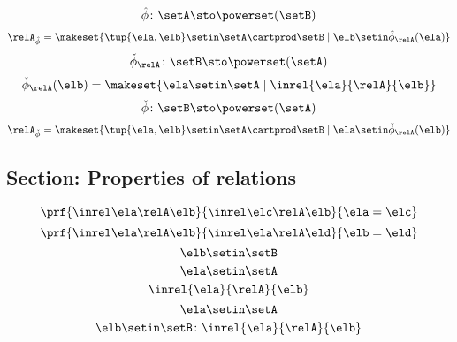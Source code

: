 \begin{forslides}
\begin{equation}
\hat \phi \colon \setA \sto \powerset (\setB)
\end{equation}
 \begin{equation}\label{eq:slides_session2_121}
\relA_{\hat \phi} = \makeset{ \tup{\ela, \elb} \setin \setA \cartprod \setB \mid \elb \setin \hat \phi_{\relA}(\ela)   }
\end{equation}
\begin{equation}\label{eq:slides_session2_122}
\check \phi_{\relA} \colon \setB \sto \powerset (\setA)
\end{equation}
 \begin{equation}\label{eq:slides_session2_123}
\check \phi_{\relA} (\elb) = \makeset{ \ela \setin \setA \mid \inrel{\ela}{\relA}{\elb}}
\end{equation}
\begin{equation}\label{eq:slides_session2_124}
\check \phi \colon \setB \sto \powerset (\setA)
\end{equation}
 \begin{equation}\label{eq:slides_session2_125}
 \relA_{\check \phi} = \makeset{ \tup{\ela, \elb} \setin \setA \cartprod \setB \mid \ela \setin \check \phi_{\relA}(\elb)}
\end{equation}

\subsection{Section: Properties of relations}


\begin{equation}\label{eq:slides_session2_126}
\prf{
                      \inrel \ela \relA \elb
                  }{
                      \inrel \elc \relA \elb
                  }{
                      \ela=\elc
                  }
\end{equation}
 \begin{equation}\label{eq:slides_session2_127}
 \prf{
                      \inrel \ela \relA \elb
                  }{
                      \inrel \ela \relA \eld
                  }{
                      \elb = \eld
                  }
\end{equation}
\begin{equation}\label{eq:slides_session2_128}
\elb\setin \setB
\end{equation}
 \begin{equation}\label{eq:slides_session2_129}
\ela\setin \setA
\end{equation}
\begin{equation}\label{eq:slides_session2_130}
\inrel{\ela}{\relA}{\elb}
\end{equation}
 \begin{equation}\label{eq:slides_session2_131}
\ela\setin \setA
\end{equation}
\begin{equation}\label{eq:slides_session2_132}
\elb \setin \setB\colon \inrel{\ela}{\relA}{\elb}
\end{equation}


\end{forslides}
